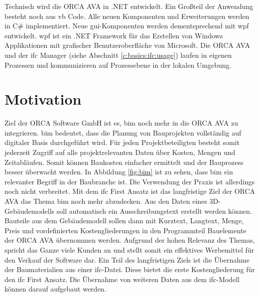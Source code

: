 Technisch wird die ORCA AVA in .NET entwickelt. Ein Großteil der Anwendung besteht noch aus \ac{vb} Code. Alle neuen Komponenten und Erweiterungen werden in C\# implementiert. Neue \ac{gui}-Komponenten werden dementsprechend mit \ac{wpf} entwickelt. \ac{wpf} ist ein .NET Framework für das Erstellen von Windows Applikationen mit grafischer Benutzeroberfläche von Microsoft. \citep{Microsoft_2022} Die ORCA AVA und der \ac{ifc} Manager (siehe Abschnitt \ref{c:basics:ifc:usage}) laufen in eigenen Prozessen und kommunizieren auf Prozessebene in der lokalen Umgebung. 

\section{Motivation}
\label{c:intro:motivation}

Ziel der \glqq ORCA Software GmbH\grqq{} ist es, \ac{bim} noch mehr in die ORCA AVA zu integrieren. \ac{bim} bedeutet, dass die Planung von Bauprojekten vollständig auf digitaler Basis durchgeführt wird.  Für jeden Projektbeteiligten besteht somit jederzeit Zugriff auf alle projektrelevanten Daten über Kosten, Mengen und Zeitabläufen. Somit können Baukosten einfacher ermittelt und der Bauprozess besser überwacht werden. In Abbildung \ref{fig:bim} ist zu sehen, dass \ac{bim} ein relevanter Begriff in der Baubranche ist. Die Verwendung der Praxis ist allerdings noch nicht verbreitet. \citep[p.~20]{Thomas_Baumanns_Dr_Philipp-Stephan_Freber_Dr_Kai-Stefan_Schober_Dr_Florian_Kirchner2016-gu} Mit dem \glqq \ac{ifc} First\grqq{} Ansatz ist das langfristige Ziel der ORCA AVA das Thema \ac{bim} noch mehr abzudecken. Aus den Daten eines 3D-Gebäudemodells soll automatisch ein Ausschreibungstext erstellt werden können. Bauteile aus dem Gebäudemodell sollen dann mit Kurztext, Langtext, Menge, Preis und vordefinierten Kostengliederungen in den Programmteil Bauelemente der ORCA AVA übernommen werden. Aufgrund der hohen Relevanz des Themas, spricht das Ganze viele Kunden an und stellt somit ein effektives Werbemittel für den Verkauf der Software dar. Ein Teil des langfristigen Ziels ist die Übernahme der Baumaterialien aus einer \ac{ifc}-Datei. Diese bietet die erste Kostengliederung für den \glqq \ac{ifc} First\grqq{} Ansatz. Die Übernahme von weiteren Daten aus dem \ac{ifc}-Modell können darauf aufgebaut werden.

